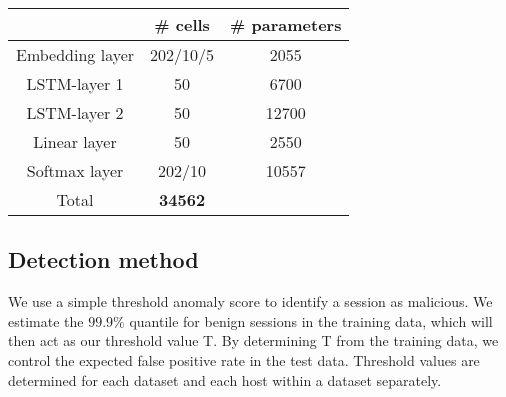 
\begin{table}[ht]
\centering
\begin{tabular}{c|c|c}
&\# cells &\# parameters\\ \hline
Embedding layer&202/10/5 &2055\\ %
LSTM-layer 1&50 & 6700\\ %
LSTM-layer 2 & 50 & 12700\\ %
Linear layer & 50 & 2550\\ %
Softmax layer & 202/10 & 10557\\ \hline %
Total &\textbf{34562}
\end{tabular}
\end{table}

\subsection{Detection method}\label{SecF:decmeth}

We use a simple threshold anomaly score to identify a session as malicious. We estimate the $99.9\%$ quantile for benign sessions in the training data, which will then act as our threshold value T. By determining T from the training data, we control the expected false positive rate in the test data. Threshold values are determined for each dataset and each host within a dataset separately. 


